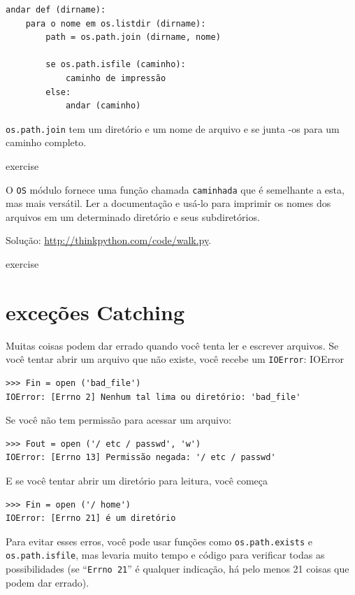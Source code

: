 \documentclass[10pt]{book}
\begin{document}
\begin{exercise}
\begin{v erbatim}
\begin{verbatim}
andar def (dirname):
    para o nome em os.listdir (dirname):
        path = os.path.join (dirname, nome)

        se os.path.isfile (caminho):
            caminho de impressão
        else:
            andar (caminho)
\end{verbatim}
%
{\tt os.path.join} tem um diretório e um nome de arquivo e se junta
-os para um caminho completo.  

\begin{} exercise

O {\tt OS} módulo fornece uma função chamada {\tt caminhada}
que é semelhante a esta, mas mais versátil. Ler
a documentação e usá-lo para imprimir os nomes dos
arquivos em um determinado diretório e seus subdiretórios.

Solução: \url{http://thinkpython.com/code/walk.py}.

\end{} exercise


\section{exceções Catching}
\label{catch}

Muitas coisas podem dar errado quando você tenta ler e escrever
arquivos. Se você tentar abrir um arquivo que não existe, você recebe um
{\tt IOError}:
\index{} IOError

\begin{verbatim}
>>> Fin = open ('bad_file')
IOError: [Errno 2] Nenhum tal lima ou diretório: 'bad_file'
\end{verbatim}
%
Se você não tem permissão para acessar um arquivo:

\begin{verbatim}
>>> Fout = open ('/ etc / passwd', 'w')
IOError: [Errno 13] Permissão negada: '/ etc / passwd'
\end{verbatim}
%
E se você tentar abrir um diretório para leitura, você começa

\begin{verbatim}
>>> Fin = open ('/ home')
IOError: [Errno 21] é um diretório
\end{verbatim}
%
Para evitar esses erros, você pode usar funções como {\tt os.path.exists}
e {\tt os.path.isfile}, mas levaria muito tempo e código
para verificar todas as possibilidades (se ``{\tt Errno 21}'' é qualquer
indicação, há pelo menos 21 coisas que podem dar errado).


\end{v erbatim}
\end{exercise}
\end{document}
